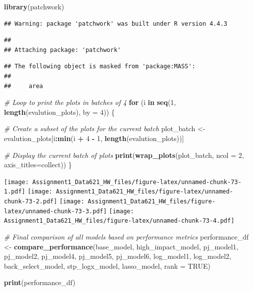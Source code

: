 \documentclass[
]{article}
\newenvironment{Shaded}{\begin{snugshade}}{\end{snugshade}}
\newcommand{\AttributeTok}[1]{\textcolor[rgb]{0.13,0.29,0.53}{#1}}
\newcommand{\CommentTok}[1]{\textcolor[rgb]{0.56,0.35,0.01}{\textit{#1}}}
\newcommand{\ConstantTok}[1]{\textcolor[rgb]{0.56,0.35,0.01}{#1}}
\newcommand{\ControlFlowTok}[1]{\textcolor[rgb]{0.13,0.29,0.53}{\textbf{#1}}}
\newcommand{\DecValTok}[1]{\textcolor[rgb]{0.00,0.00,0.81}{#1}}
\newcommand{\FunctionTok}[1]{\textcolor[rgb]{0.13,0.29,0.53}{\textbf{#1}}}
\newcommand{\NormalTok}[1]{#1}
\newcommand{\OtherTok}[1]{\textcolor[rgb]{0.56,0.35,0.01}{#1}}
\newcommand{\SpecialCharTok}[1]{\textcolor[rgb]{0.81,0.36,0.00}{\textbf{#1}}}
\newcommand{\StringTok}[1]{\textcolor[rgb]{0.31,0.60,0.02}{#1}}
\begin{document}
\begin{Shaded}
\begin{Highlighting}[]
\FunctionTok{library}\NormalTok{(patchwork)}
\end{Highlighting}
\end{Shaded}

\begin{verbatim}
## Warning: package 'patchwork' was built under R version 4.4.3
\end{verbatim}

\begin{verbatim}
## 
## Attaching package: 'patchwork'
\end{verbatim}

\begin{verbatim}
## The following object is masked from 'package:MASS':
## 
##     area
\end{verbatim}

\begin{Shaded}
\begin{Highlighting}[]
\CommentTok{\# Loop to print the plots in batches of 4}
\ControlFlowTok{for}\NormalTok{ (i }\ControlFlowTok{in} \FunctionTok{seq}\NormalTok{(}\DecValTok{1}\NormalTok{, }\FunctionTok{length}\NormalTok{(evalution\_plots), }\AttributeTok{by =} \DecValTok{4}\NormalTok{)) \{}
  
  \CommentTok{\# Create a subset of the plots for the current batch}
\NormalTok{  plot\_batch }\OtherTok{\textless{}{-}}\NormalTok{ evalution\_plots[i}\SpecialCharTok{:}\FunctionTok{min}\NormalTok{(i }\SpecialCharTok{+} \DecValTok{4} \SpecialCharTok{{-}} \DecValTok{1}\NormalTok{, }\FunctionTok{length}\NormalTok{(evalution\_plots))]}
  
  \CommentTok{\# Display the current batch of plots}
  \FunctionTok{print}\NormalTok{(}\FunctionTok{wrap\_plots}\NormalTok{(plot\_batch, }\AttributeTok{ncol =} \DecValTok{2}\NormalTok{, }\AttributeTok{axis\_titles=}\StringTok{\textquotesingle{}collect\textquotesingle{}}\NormalTok{))  }
\NormalTok{\}}
\end{Highlighting}
\end{Shaded}

\texttt{[image: Assignment1\_Data621\_HW\_files/figure-latex/unnamed-chunk-73-1.pdf]}
\texttt{[image: Assignment1\_Data621\_HW\_files/figure-latex/unnamed-chunk-73-2.pdf]}
\texttt{[image: Assignment1\_Data621\_HW\_files/figure-latex/unnamed-chunk-73-3.pdf]}
\texttt{[image: Assignment1\_Data621\_HW\_files/figure-latex/unnamed-chunk-73-4.pdf]}

\begin{Shaded}
\begin{Highlighting}[]
\CommentTok{\# Final comparison of all models based on performance metrics}
\NormalTok{performance\_df }\OtherTok{\textless{}{-}} \FunctionTok{compare\_performance}\NormalTok{(base\_model, high\_impact\_model, pj\_model1, pj\_model2, pj\_model4, pj\_model5, pj\_model6, log\_model1, log\_model2, back\_select\_model, stp\_logx\_model, lasso\_model,  }\AttributeTok{rank =} \ConstantTok{TRUE}\NormalTok{)}

\FunctionTok{print}\NormalTok{(performance\_df)}
\end{Highlighting}
\end{Shaded}
\end{document}
